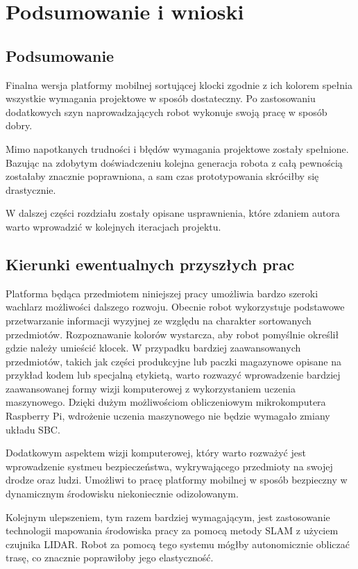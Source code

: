 \chapter{Podsumowanie i wnioski}

\section{Podsumowanie}

Finalna wersja platformy mobilnej sortującej klocki zgodnie z ich kolorem spełnia wszystkie wymagania projektowe w sposób dostateczny. Po zastosowaniu dodatkowych szyn naprowadzających robot wykonuje swoją pracę w sposób dobry. 

Mimo napotkanych trudności i błędów wymagania projektowe zostały spełnione. Bazując na zdobytym doświadczeniu kolejna generacja robota z całą pewnością zostałaby znacznie poprawniona, a sam czas prototypowania skróciłby się drastycznie.

W dalszej części rozdziału zostały opisane usprawnienia, które zdaniem autora warto wprowadzić w kolejnych iteracjach projektu. 

\section{Kierunki ewentualnych przyszłych prac}

Platforma będąca przedmiotem niniejszej pracy umożliwia bardzo szeroki wachlarz możliwości dalszego rozwoju. Obecnie robot wykorzystuje podstawowe przetwarzanie informacji wyzyjnej ze względu na charakter sortowanych przedmiotów. Rozpoznawanie kolorów wystarcza, aby robot pomyślnie określił gdzie należy umieścić klocek. W przypadku bardziej zaawansowanych przedmiotów, takich jak części produkcyjne lub paczki magazynowe opisane na przykład kodem lub specjalną etykietą, warto rozwazyć wprowadzenie bardziej zaawansowanej formy wizji komputerowej z wykorzystaniem uczenia maszynowego. Dzięki dużym możliwościom obliczeniowym mikrokomputera Raspberry Pi, wdrożenie uczenia maszynowego nie będzie wymagało zmiany układu SBC. 

Dodatkowym aspektem wizji komputerowej, który warto rozważyć jest wprowadzenie systmeu bezpieczeństwa, wykrywającego przedmioty na swojej drodze oraz ludzi. Umożliwi to pracę platformy mobilnej w sposób bezpieczny w dynamicznym środowisku niekoniecznie odizolowanym. 

\hspace{lcm}

Kolejnym ulepszeniem, tym razem bardziej wymagającym, jest zastosowanie technologii mapowania środowiska pracy za pomocą metody SLAM z użyciem czujnika LIDAR. Robot za pomocą tego systemu mógłby autonomicznie obliczać trasę, co znacznie poprawiłoby jego elastyczność. 


